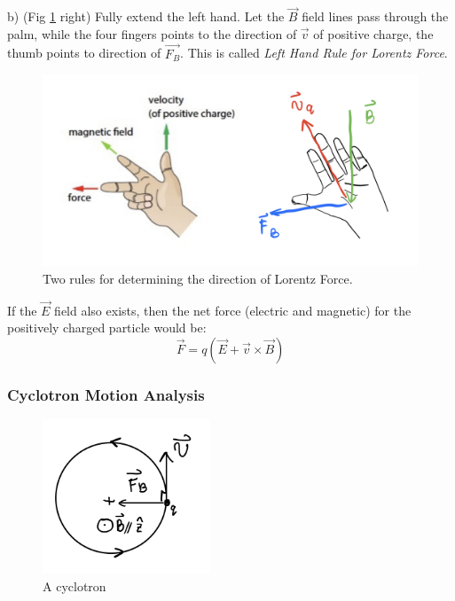 \documentclass[12pt,a4paper,twoside]{article}
\numberwithin{equation}{section}
\begin{document}
\begin{itemize}
            \subitem b) (Fig \ref{fig:lorentz-dir} right) Fully extend the left hand. Let the $\overrightarrow{B}$ field lines pass through the palm, while the four fingers points to the direction of $\overrightarrow{v}$ of positive charge, the thumb points to direction of $\overrightarrow{F_B}$. This is called \textit{Left Hand Rule for Lorentz Force}.
            \begin{figure}[ht]
                \centering
                \includegraphics[width=12cm]{250-Revision/lorentz-force-dir.png}
                \caption{Two rules for determining the direction of Lorentz Force.}
                \label{fig:lorentz-dir}
            \end{figure}
        
    \end{itemize}
    If the $\overrightarrow{E}$ field also exists, then the net force (electric and magnetic) for the positively charged particle would be:
    \begin{equation}
        \overrightarrow{F}=q(\overrightarrow{E}+\overrightarrow{v}\times \overrightarrow{B})
    \end{equation}

\subsubsection{Cyclotron Motion Analysis}
    \begin{figure}[ht]
        \centering
        \includegraphics[width=5cm]{250-Revision/cyclotron.png}
        \caption{A cyclotron}
        \label{fig:cyclotron}
    \end{figure}
    
\end{document}
